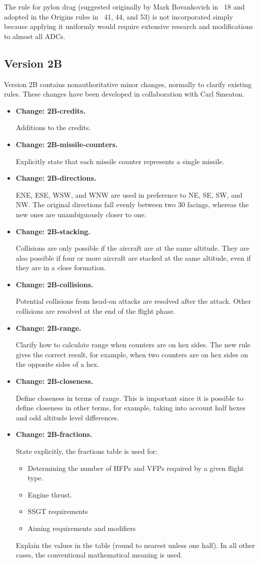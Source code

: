 \documentclass[10pt]{report}
\newcommand{\itemtag}[1]{\item \textbf{Change: #1.}\par}
\begin{document}
The rule for pylon drag (suggested originally by Mark Bovankovich in {\APJ}~18 and adopted in the Origins rules in {\APJ}~41, 44, and 53) is not incorporated simply because applying it uniformly would require extensive research and modifications to almost all ADCs.

\subsection{Version 2B}

Version 2B contains nonauthoritative minor changes, normally to clarify existing rules. These changes have been developed in collaboration with Carl Smeaton.

\begin{itemize}
    \itemtag{2B-credits} Additions to the credits.
    
    \itemtag{2B-missile-counters} Explicitly state that each missile counter represents a single missile.

    \itemtag{2B-directions} ENE, ESE, WSW, and WNW are used in preference to NE, SE, SW, and NW. The original directions fall evenly between two 30{\deg} facings, whereas the new  ones are unambiguously closer to one.

    \itemtag{2B-stacking} Collisions are only possible if the aircraft are at the same altitude. They are also possible if four or more aircraft are stacked at the same altitude, even if they are in a close formation.

    \itemtag{2B-collisions} Potential collisions from head-on attacks are resolved after the attack. Other collisions are resolved at the end of the flight phase.

    \itemtag{2B-range} Clarify how to calculate range when counters are on hex sides. The new rule gives the correct result, for example, when two counters are on hex sides on the opposite sides of a hex.
    
    \itemtag{2B-closeness} Define closeness in terms of range. This is important since it is possible to define closeness in other terms, for example, taking into account half hexes and odd altitude level differences.

    \itemtag{2B-fractions} State explicitly, the fractions table is used for:
    \begin{itemize}
        \item Determining the number of HFPs and VFPs required by a given flight type.
        \item Engine thrust.
        \item SSGT requirements
        \item Aiming requirements and modifiers
    \end{itemize}
    Explain the values in the table (round to nearest unless one half). In all other cases, the conventional mathematical meaning is used.


\end{itemize}
\end{document}
